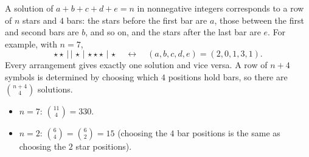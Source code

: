A solution of $a+b+c+d+e=n$ in nonnegative integers corresponds to a row of $n$ stars and $4$ bars: the stars before the first bar are $a$, those between the first and second bars are $b$, and so on, and the stars after the last bar are $e$. For example, with $n=7$,
\[
\star\star\,|\,|\,\star\,|\,\star\star\star\,|\,\star \quad\longleftrightarrow\quad (a,b,c,d,e)=(2,0,1,3,1).
\]
Every arrangement gives exactly one solution and vice versa. A row of $n+4$ symbols is determined by choosing which $4$ positions hold bars, so there are $\binom{n+4}{4}$ solutions.
\begin{itemize}
\item $n=7$: $\binom{11}{4}=\boxed{330}$.
\item $n=2$: $\binom{6}{4}=\binom{6}{2}=\boxed{15}$ (choosing the $4$ bar positions is the same as choosing the $2$ star positions).
\end{itemize}
